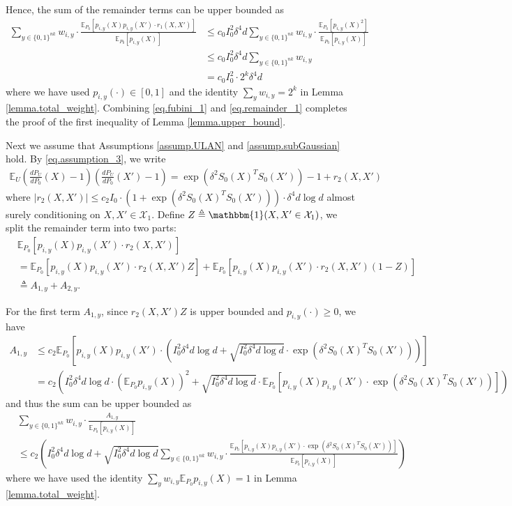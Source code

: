 \documentclass[final,12pt]{colt2018} %
\def \bE {\mathbb{E}}
\newcommand{\calX}{{\mathcal{X}}}
\begin{document}
Hence, the sum of the remainder terms can be upper bounded as
\begin{align}
\sum_{y\in \{0,1\}^{nk}} w_{i,y}\cdot \frac{\bE_{P_0} \left[ p_{i,y}(X)p_{i,y}(X')\cdot r_1(X,X')\right]}{\bE_{P_0}[p_{i,y}(X)]} &\le c_0I_0^2\delta^4d\sum_{y\in \{0,1\}^{nk}} w_{i,y}\cdot\frac{\bE_{P_0}[p_{i,y}(X)^2]}{\bE_{P_0}[p_{i,y}(X)]} \nonumber\\
&\le c_0I_0^2\delta^4d\sum_{y\in \{0,1\}^{nk}} w_{i,y} \nonumber\\
&= c_0I_0^2\cdot 2^k\delta^4d \label{eq.remainder_1}
\end{align}
where we have used $p_{i,y}(\cdot)\in [0,1]$ and the identity $\sum_{y}w_{i,y}=2^k$ in Lemma \ref{lemma.total_weight}. Combining \eqref{eq.fubini_1} and \eqref{eq.remainder_1} completes the proof of the first inequality of Lemma \ref{lemma.upper_bound}. 

Next we assume that Assumptions \ref{assump.ULAN} and \ref{assump.subGaussian} hold. By \eqref{eq.assumption_3}, we write
\begin{align*}
\bE_U \left(\frac{dP_U}{dP_0}(X) - 1\right)\left(\frac{dP_U}{dP_0}(X') - 1\right) = \exp(\delta^2 S_0(X)^TS_0(X'))-1 + r_2(X,X')
\end{align*}
where $|r_2(X,X')|\le c_2I_0\cdot (1+\exp(\delta^2 S_0(X)^TS_0(X')) )\cdot \delta^4d\log d$ almost surely conditioning on $X,X'\in \calX_1$. Define $Z\triangleq \mathbbm{1}(X,X'\in \calX_1)$, we split the remainder term into two parts: 
\begin{align*}
&\bE_{P_0} \left[ p_{i,y}(X)p_{i,y}(X')\cdot r_2(X,X')\right] \\
&= \bE_{P_0} \left[ p_{i,y}(X)p_{i,y}(X')\cdot r_2(X,X')Z\right] + \bE_{P_0} \left[ p_{i,y}(X)p_{i,y}(X')\cdot r_2(X,X')(1-Z)\right] \\
&\triangleq A_{1,y} + A_{2,y}. 
\end{align*}

For the first term $A_{1,y}$, since $r_2(X,X')Z$ is upper bounded and $p_{i,y}(\cdot)\ge 0$, we have
\begin{align*}
A_{1,y} &\le c_2\bE_{P_0} \left[ p_{i,y}(X)p_{i,y}(X')\cdot (I_0^2\delta^4d\log d+\sqrt{I_0^2\delta^4d\log d}\cdot\exp(\delta^2 S_0(X)^TS_0(X')) )\right] \\
&= c_2\left(I_0^2\delta^4d\log d\cdot (\bE_{P_0} p_{i,y}(X))^2 + \sqrt{I_0^2\delta^4d\log d}\cdot \bE_{P_0} \left[ p_{i,y}(X)p_{i,y}(X')\cdot \exp(\delta^2 S_0(X)^TS_0(X')) \right]  \right)
\end{align*}
and thus the sum can be upper bounded as
\begin{align}
&\sum_{y\in \{0,1\}^{nk} } w_{i,y} \cdot \frac{A_{1,y}}{\bE_{P_0}[p_{i,y}(X)] }\nonumber \\ &\le  c_2\left(I_0^2\delta^4d\log d  + \sqrt{I_0^2\delta^4d\log d }\sum_{y\in \{0,1\}^{nk}} w_{i,y}\cdot \frac{\bE_{P_0} \left[ p_{i,y}(X)p_{i,y}(X')\cdot \exp(\delta^2 S_0(X)^TS_0(X')) \right]}{\bE_{P_0}[p_{i,y}(X)] }\right) \label{eq.remainder_2}
\end{align}
where we have used the identity $\sum_{y} w_{i,y}\bE_{P_0}p_{i,y}(X)=1$ in Lemma \ref{lemma.total_weight}.
\end{document}
